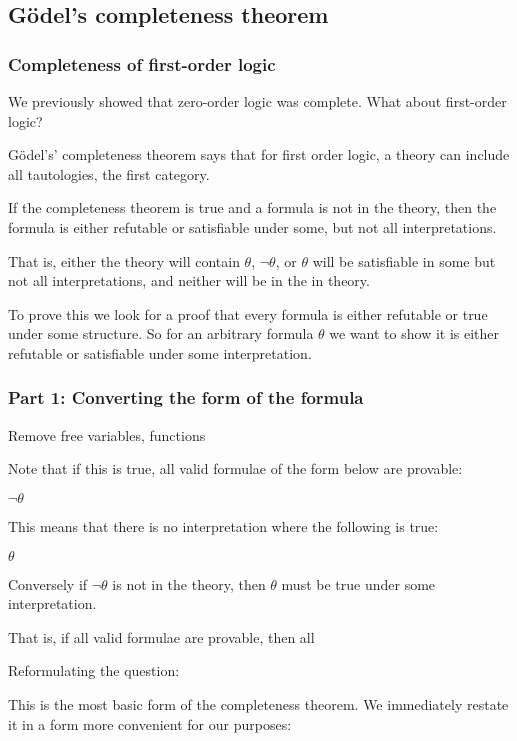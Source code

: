 
\subsection{G{\"o}del’s completeness theorem}

\subsubsection{Completeness of first-order logic}

We previously showed that zero-order logic was complete. What about first-order logic?

G{\"o}del’s’ completeness theorem says that for first order logic, a theory can include all tautologies, the first category.

If the completeness theorem is true and a formula is not in the theory, then the formula is either refutable or satisfiable under some, but not all interpretations.

That is, either the theory will contain \(\theta \), \(\neg \theta \), or \(\theta \) will be satisfiable in some but not all interpretations, and neither will be in the in theory.

To prove this we look for a proof that every formula is either refutable or true under some structure. So for an arbitrary formula \(\theta \) we want to show it is either refutable or satisfiable under some interpretation.

\subsubsection{Part 1: Converting the form of the formula}

Remove free variables, functions

Note that if this is true, all valid formulae of the form below are provable:

\(\neg \theta \)

This means that there is no interpretation where the following is true:

\(\theta \)

Conversely if \(\neg \theta \) is not in the theory, then \(\theta \) must be true under some interpretation.

That is, if all valid formulae are provable, then all

Reformulating the question:

This is the most basic form of the completeness theorem. We immediately restate it in a form more convenient for our purposes:

